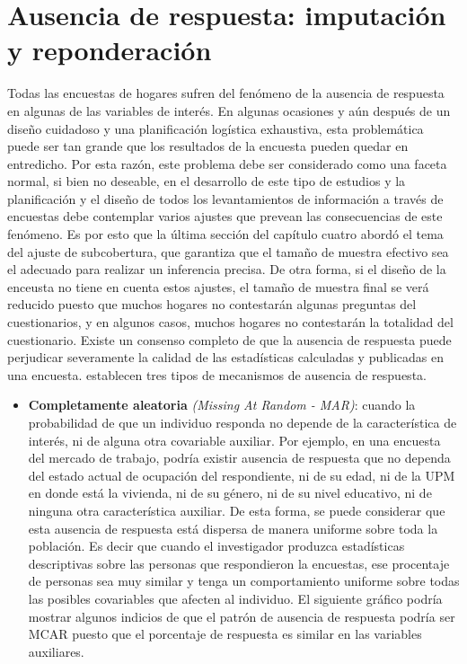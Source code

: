 \hypertarget{ausencia-de-respuesta-imputacion-y-reponderacion}{%
\chapter{Ausencia de respuesta: imputación y reponderación}\label{ausencia-de-respuesta-imputacion-y-reponderacion}}

Todas las encuestas de hogares sufren del fenómeno de la ausencia de respuesta en algunas de las variables de interés. En algunas ocasiones y aún después de un diseño cuidadoso y una planificación logística exhaustiva, esta problemática puede ser tan grande que los resultados de la encuesta pueden quedar en entredicho. Por esta razón, este problema debe ser considerado como una faceta normal, si bien no deseable, en el desarrollo de este tipo de estudios y la planificación y el diseño de todos los levantamientos de información a través de encuestas debe contemplar varios ajustes que prevean las consecuencias de este fenómeno. Es por esto que la última sección del capítulo cuatro abordó el tema del ajuste de subcobertura, que garantiza que el tamaño de muestra efectivo sea el adecuado para realizar un inferencia precisa. De otra forma, si el diseño de la enceusta no tiene en cuenta estos ajustes, el tamaño de muestra final se verá reducido puesto que muchos hogares no contestarán algunas preguntas del cuestionarios, y en algunos casos, muchos hogares no contestarán la totalidad del cuestionario. Existe un consenso completo de que la ausencia de respuesta puede perjudicar severamente la calidad de las estadísticas calculadas y publicadas en una encuesta. \citet{Little_Rubin_2002} establecen tres tipos de mecanismos de ausencia de respuesta.

\begin{itemize}
\tightlist
\item
  \textbf{Completamente aleatoria} \emph{(Missing At Random - MAR)}: cuando la probabilidad de que un individuo responda no depende de la característica de interés, ni de alguna otra covariable auxiliar. Por ejemplo, en una encuesta del mercado de trabajo, podría existir ausencia de respuesta que no dependa del estado actual de ocupación del respondiente, ni de su edad, ni de la UPM en donde está la vivienda, ni de su género, ni de su nivel educativo, ni de ninguna otra característica auxiliar. De esta forma, se puede considerar que esta ausencia de respuesta está dispersa de manera uniforme sobre toda la población. Es decir que cuando el investigador produzca estadísticas descriptivas sobre las personas que respondieron la encuestas, ese procentaje de personas sea muy similar y tenga un comportamiento uniforme sobre todas las posibles covariables que afecten al individuo. El siguiente gráfico podría mostrar algunos indicios de que el patrón de ausencia de respuesta podría ser MCAR puesto que el porcentaje de respuesta es similar en las variables auxiliares.
\end{itemize}

